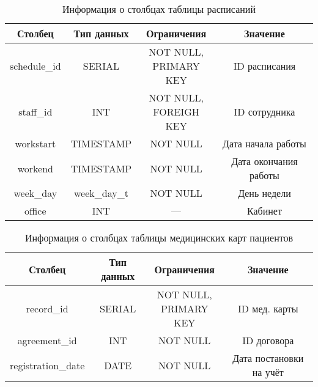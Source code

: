 \begin{table}[h!]
\begin{center}
	\captionsetup{justification=raggedright,singlelinecheck=off,margin=5mm}
	\caption{Информация о столбцах таблицы расписаний}
	\begin{tabular}{| c | c | c | c |}
		\hline
		Столбец & Тип данных & Ограничения & Значение \\
		\hline
		schedule\_id & SERIAL & \makecell{NOT NULL, \\ PRIMARY KEY} & ID расписания \\
		\hline
		staff\_id & INT & \makecell{NOT NULL, \\ FOREIGH KEY} & ID сотрудника \\
		\hline
		workstart & TIMESTAMP & NOT NULL & Дата начала работы\\
		\hline
		workend & TIMESTAMP & NOT NULL & Дата окончания работы \\
		\hline
		week\_day & week\_day\_t & NOT NULL & День недели \\
		\hline
		office & INT  & --- & Кабинет \\
		\hline
	\end{tabular}
	\label{table:schedules-columns}
\end{center}
\end{table}

\begin{table}[h!]
\begin{center}
	\captionsetup{justification=raggedright,singlelinecheck=off,margin=5mm}
	\caption{Информация о столбцах таблицы медицинских карт пациентов}
	\begin{tabular}{| c | c | c | c |}
		\hline
		Столбец & Тип данных & Ограничения & Значение \\
		\hline
		record\_id & SERIAL & \makecell{NOT NULL, \\ PRIMARY KEY} & ID мед. карты \\
		\hline
		agreement\_id & INT & NOT NULL & ID договора \\
		\hline
		registration\_date & DATE & NOT NULL & Дата постановки на учёт\\
		\hline
	\end{tabular}
	\label{table:records-columns}
\end{center}
\end{table}

